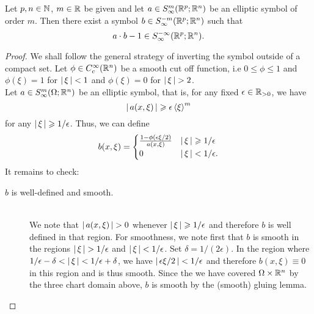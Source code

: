 \documentclass[12pt]{article}
\begin{document}
\begin{flemma}
    Let $p, n \in \N$, $m \in \R$ be given and let $a \in S^m_\infty(\R^p; \R^n)$ be an elliptic symbol of order $m$. Then there exist a symbol $b \in S^{-m}_\infty(\R^p; \R^n)$ such that 
    \[
    a \cdot b - 1 \in S^{-\infty}_\infty(\R^p; \R^n). 
    \]
\end{flemma}
\begin{proof}
    We shall follow the general strategy of inverting the symbol outside of a compact set. Let $\phi \in C^\infty_c(\R^n)$ be a smooth cut off function, i.e $0 \leq \phi \leq 1$ and $ \phi(\xi) = 1$ for $\abs{\xi} < 1$ and $\phi(\xi) = 0 $ for $\abs{\xi} > 2$. \\
    
    Let $a \in S^{m}_\infty(\Omega; \R^n)$ be an elliptic symbol, that is, for any fixed $\epsilon \in \R_{> 0}$, we have 
    \[
    \abs{a(x, \xi)} \geq \epsilon \sym[\xi]^m
    \]
    for any $\abs{\xi} \geq 1/\epsilon$. Thus, we can define 
    \begin{align*}
    b(x, \xi) = 
    \begin{cases}
    \frac{1 - \phi( \epsilon \xi /2)}{a(x, \xi)} & \abs{\xi} \geq 1/ \epsilon \\
    0 & \abs{\xi} < 1 / \epsilon. 
    \end{cases}
    \end{align*}
    It remains to check: 
    \begin{description}
        \item[$b$ is well-defined and smooth. ] \hfill \\
        We note that $\abs{a(x, \xi)} > 0$ whenever $\abs{\xi} \geq 1/\epsilon$ and therefore $b$ is well defined in that region. For smoothness, we note first that $b$ is smooth in the regions $\abs{\xi} > 1/ \epsilon$ and $\abs{\xi} < 1/\epsilon$. Set $\delta = 1/(2 \epsilon)$. In the region where $1/\epsilon - \delta < \abs{\xi} < 1/\epsilon + \delta$, we have $\abs{\epsilon \xi/ 2} < 1/\epsilon$ and therefore $b(x, \xi) \equiv 0$ in this region and is thus smooth. Since the we have covered $\Omega \times \R^n$ by the three chart domain above, $b$ is smooth by the (smooth) gluing lemma. 
        

\end{description}
\end{proof}
\end{document}
